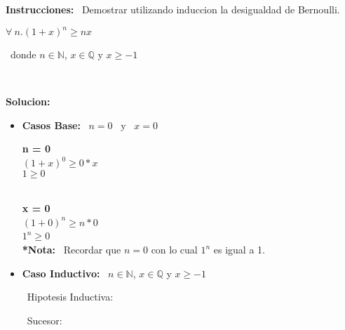\documentclass[10pt,a4paper]{article}
\begin{document}
\begin{large}
\textbf{Instrucciones:} \ {Demostrar utilizando induccion la desigualdad de Bernoulli.}
\end{large}

\begin{center}
$ \forall\ n.(1+x)^n \geq nx $
\end{center}
\
donde $n\in \mathbb{N}$, $x\in \mathbb{Q}$ y $x\geq -1$

\
\\\begin{large}
\textbf{Solucion: }
\end{large}

\begin{itemize}
\item \textbf{Casos Base:} \ $ n=0 $ \ y \ $ x=0 $
\begin{center}
\textbf{n = 0}
\
\\$ (1+x)^0 \geq 0*x $
\
\\$ 1 \geq 0 $

\
\\\textbf{x = 0}
\
\\ $ (1+0)^n \geq n*0 $
\
\\ $ 1^n \geq 0 $
\
\\\textbf{*Nota:} \ Recordar que $ n=0 $ con lo cual $ 1^n $ es igual a 1.
\end{center}

\item \textbf{Caso Inductivo:} \ $n\in \mathbb{N}$, $x\in \mathbb{Q}$ y $x\geq -1$

\ Hipotesis Inductiva:

\ Sucesor: 
\end{itemize}
\end{document}
